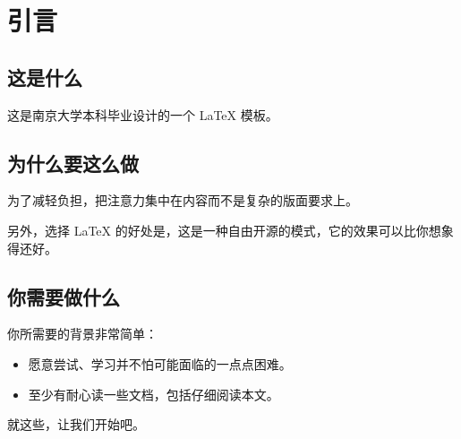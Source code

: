 \chapter{引言}

\section{这是什么}
这是南京大学本科毕业设计的一个 \LaTeX{} 模板。

\section{为什么要这么做}
为了减轻负担，把注意力集中在内容而不是复杂的版面要求上。

另外，选择 \LaTeX{} 的好处是，这是一种自由开源的模式，它的效果可以比你想象得还好。

\section{你需要做什么}
你所需要的背景非常简单：
\begin{itemize}
	\item 愿意尝试、学习并不怕可能面临的一点点困难。
	\item 至少有耐心读一些文档，包括仔细阅读本文。
\end{itemize}

就这些，让我们开始吧。
